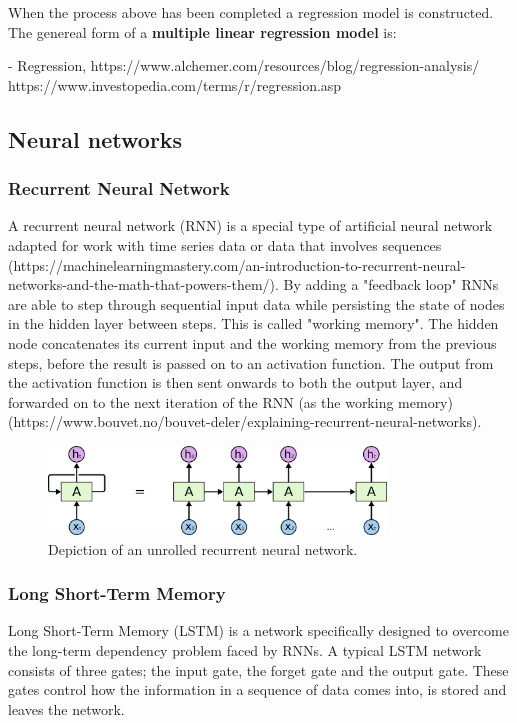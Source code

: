 When the process above has been completed a regression model is constructed. The genereal form of a \textbf{multiple linear regression model} is:  

- Regression, https://www.alchemer.com/resources/blog/regression-analysis/\\ 

https://www.investopedia.com/terms/r/regression.asp

\subsection{Neural networks}
\subsubsection{Recurrent Neural Network}
A recurrent neural network (RNN) is a special type of artificial neural network adapted for work with time series data or data that involves sequences (https://machinelearningmastery.com/an-introduction-to-recurrent-neural-networks-and-the-math-that-powers-them/). 
By adding a "feedback loop" RNNs are able to step through sequential input data while persisting the state of nodes in the hidden layer between steps. This is called "working memory". The hidden node concatenates its current input and the working memory from the previous steps, before the result is passed on to an activation function. The output from the activation function is then sent onwards to both the output layer, and forwarded on to the next iteration of the RNN (as the working memory)  (https://www.bouvet.no/bouvet-deler/explaining-recurrent-neural-networks).

\begin{figure}[H]
    \centering
    \includegraphics[width=0.8\textwidth]{data/Figures/Neural networks/RNN.png}
    \caption[Depiction of an unrolled recurrent neural network]{Depiction of an unrolled recurrent neural network.}\label{fig:RNN}
\end{figure}
\subsubsection{Long Short-Term Memory} 
Long Short-Term Memory (LSTM) is a network specifically designed to overcome the long-term dependency problem faced by RNNs. 
A typical LSTM network consists of three gates; the input gate, the forget gate and the output gate.
These gates control how the information in a sequence of data comes into, is stored and leaves the network.  

